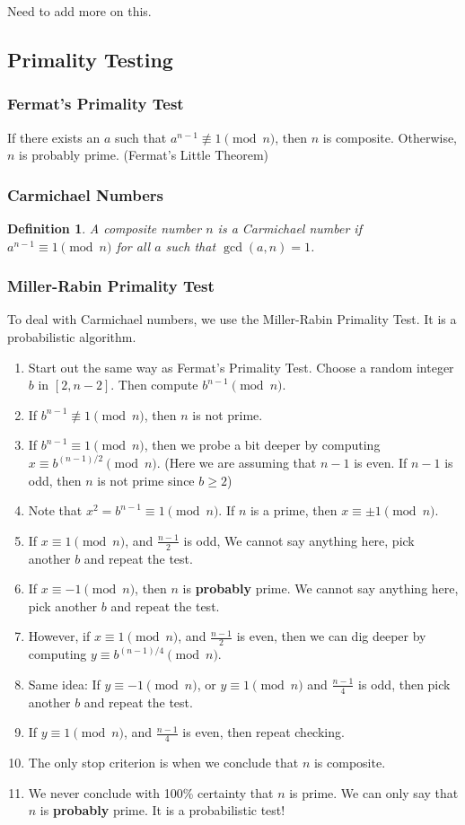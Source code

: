 \documentclass[letterpaper,12pt,oneside]{article}
\newtheorem{definition}{Definition}
\begin{document}
Need to add more on this.

\subsection{Primality Testing}
\subsubsection{Fermat's Primality Test}
If there exists an $a$ such that $a^{n-1}\not\equiv 1\pmod{n}$, then $n$ is composite. Otherwise, $n$ is probably prime. (Fermat's Little Theorem)

\subsubsection{Carmichael Numbers}
\begin{definition}
    A composite number $n$ is a Carmichael number if $a^{n-1}\equiv 1\pmod{n}$ for all $a$ such that $\gcd(a,n) = 1$.
\end{definition}
\subsubsection{Miller-Rabin Primality Test}
To deal with Carmichael numbers, we use the Miller-Rabin Primality Test. It is a probabilistic algorithm.\begin{enumerate}
    \item Start out the same way as Fermat's Primality Test. Choose a random integer $b$ in $[2,n-2]$. Then compute $b^{n-1}\pmod n$.
    \item If $b^{n-1}\not\equiv 1 \pmod n$, then $n$ is not prime.
    \item If $b^{n-1}\equiv 1 \pmod n$, then we probe a bit deeper by computing $x\equiv b^{(n-1)/2}\pmod n$. (Here we are assuming that $n-1$ is even. If $n-1$ is odd, then $n$ is not prime since $b\ge 2$)
    \item Note that $x^2=b^{n-1}\equiv 1 \pmod n$. If $n$ is a prime, then $x\equiv \pm 1 \pmod n$. 
    \item If $x\equiv 1 \pmod n$, and $\frac{n-1}{2}$ is odd, We cannot say anything here, pick another $b$ and repeat the test.
    \item If $x\equiv -1 \pmod n$, then $n$ is \textbf{probably} prime. We cannot say anything here, pick another $b$ and repeat the test.
    \item However, if $x\equiv 1 \pmod n$, and $\frac{n-1}{2}$ is even, then we can dig deeper by computing $y\equiv b^{(n-1)/4}\pmod n$.
    \item Same idea: If $y\equiv - 1 \pmod n$, or $y\equiv 1 \pmod n$ and $\frac{n-1}{4}$ is odd, then pick another $b$ and repeat the test.
    \item If $y\equiv 1 \pmod n$, and $\frac{n-1}{4}$ is even, then repeat checking. 
    \item The only stop criterion is when we conclude that $n$ is composite.
    \item We never conclude with 100\% certainty that $n$ is prime. We can only say that $n$ is \textbf{probably} prime. It is a probabilistic test!
\end{enumerate}
\end{document}
